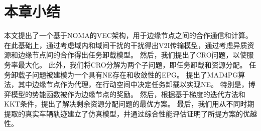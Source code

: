 \section{本章小结}\label{section 4-6}

本文提出了一个基于NOMA的VEC架构，用于边缘节点之间的合作通信和计算。
在此基础上，通过考虑域内和域间干扰的干扰得出V2I传输模型，通过考虑异质资源和边缘节点间的合作得出任务卸载模型。
然后，我们提出了CRO问题，以使服务率最大化。
此外，我们将CRO分解为两个子问题，即任务卸载和资源分配。
任务卸载子问题被建模为一个具有NE存在和收敛性的EPG。
提出了MAD4PG算法，其中边缘节点作为代理，在行动空间中决定任务卸载以实现NE。
特别是，博弈模型的势能函数被作为边缘节点的奖励。
然后，根据基于梯度的迭代方法和KKT条件，提出了解决剩余资源分配问题的最优方案。
最后，我们用从不同时期提取的真实车辆轨迹建立了仿真模型，并通过综合性能评估证明了所提方案的优越性。
